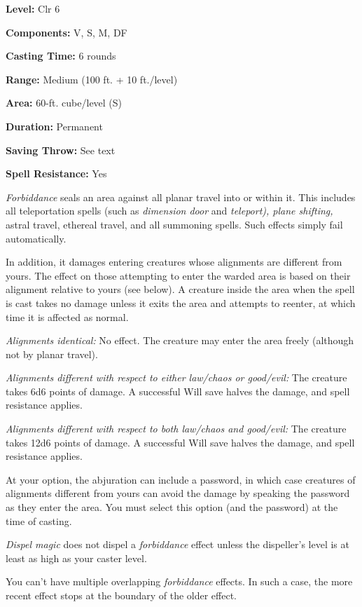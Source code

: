 \documentclass{article}
\begin{document}
\textbf{Level:} Clr 6

\textbf{Components:} V, S, M, DF

\textbf{Casting Time:} 6 rounds

\textbf{Range: }Medium (100 ft. + 10 ft./level)

\textbf{Area:} 60-ft. cube/level (S)

\textbf{Duration:} Permanent

\textbf{Saving Throw:} See text

\textbf{Spell Resistance:} Yes

\textit{Forbiddance }seals an area against all planar travel into or within it. 
This includes all teleportation spells (such as \textit{dimension door }and \textit{teleport), 
plane shifting, }astral travel, ethereal travel, and all summoning spells. Such 
effects simply fail automatically.

In addition, it damages entering creatures whose alignments are different from 
yours. The effect on those attempting to enter the warded area is based on their 
alignment relative to yours (see below). A creature inside the area when the spell 
is cast takes no damage unless it exits the area and attempts to reenter, at which 
time it is affected as normal.

\textit{Alignments identical: }No effect. The creature may enter the area freely 
(although not by planar travel).

\textit{Alignments different with respect to either law/chaos or good/evil: }The 
creature takes 6d6 points of damage. A successful Will save halves the damage, 
and spell resistance applies.

\textit{Alignments different with respect to both law/chaos and good/evil: }The 
creature takes 12d6 points of damage. A successful Will save halves the damage, 
and spell resistance applies.

At your option, the abjuration can include a password, in which case creatures 
of alignments different from yours can avoid the damage by speaking the password 
as they enter the area. You must select this option (and the password) at the time 
of casting.

\textit{Dispel magic }does not dispel a \textit{forbiddance }effect unless the 
dispeller's level is at least as high as your caster level.

You can't have multiple overlapping \textit{forbiddance }effects. In such a case, 
the more recent effect stops at the boundary of the older effect.
\end{document}
